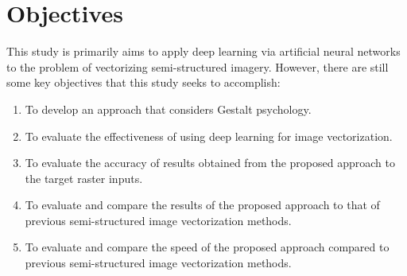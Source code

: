 \chapter{Objectives}

This study is primarily aims to apply deep learning via artificial neural networks to the problem of vectorizing semi-structured imagery. However, there are still some key objectives that this study seeks to accomplish:

\begin{enumerate}
	\item To develop an approach that considers Gestalt psychology.
	
	\item To evaluate the effectiveness of using deep learning for image vectorization.
	
	\item To evaluate the accuracy of results obtained from the proposed approach to the target raster inputs.
	
	\item To evaluate and compare the results of the proposed approach to that of previous semi-structured image vectorization methods.
	
	\item To evaluate and compare the speed of the proposed approach compared to previous semi-structured image vectorization methods.
\end{enumerate}